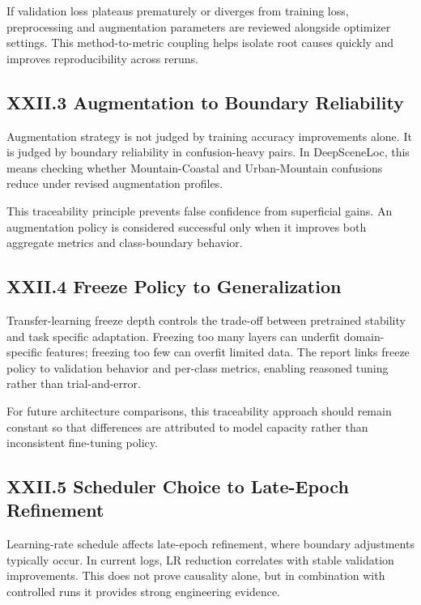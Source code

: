 If validation loss plateaus prematurely or diverges from training loss, preprocessing and augmentation parameters are reviewed alongside optimizer settings. This method-to-metric coupling helps isolate root causes quickly and improves reproducibility across reruns.

\subsection*{XXII.3 Augmentation to Boundary Reliability}
Augmentation strategy is not judged by training accuracy improvements alone. It is judged by boundary reliability in confusion-heavy pairs. In DeepSceneLoc, this means checking whether Mountain-Coastal and Urban-Mountain confusions reduce under revised augmentation profiles.

This traceability principle prevents false confidence from superficial gains. An augmentation policy is considered successful only when it improves both aggregate metrics and class-boundary behavior.

\subsection*{XXII.4 Freeze Policy to Generalization}
Transfer-learning freeze depth controls the trade-off between pretrained stability and task specific adaptation. Freezing too many layers can underfit domain-specific features; freezing too few can overfit limited data. The report links freeze policy to validation behavior and per-class metrics, enabling reasoned tuning rather than trial-and-error.

For future architecture comparisons, this traceability approach should remain constant so that differences are attributed to model capacity rather than inconsistent fine-tuning policy.

\subsection*{XXII.5 Scheduler Choice to Late-Epoch Refinement}
Learning-rate schedule affects late-epoch refinement, where boundary adjustments typically occur. In current logs, LR reduction correlates with stable validation improvements. This does not prove causality alone, but in combination with controlled runs it provides strong engineering evidence.

